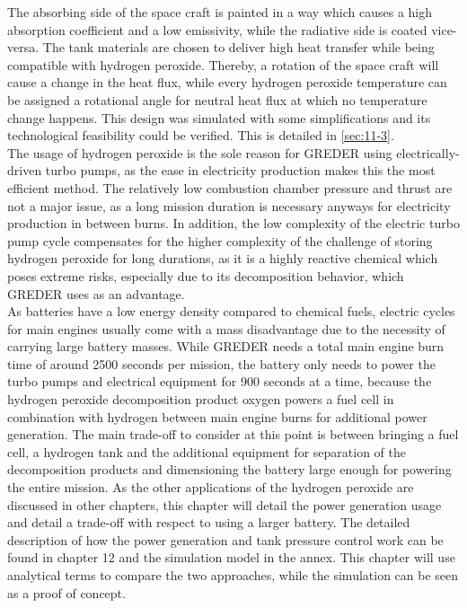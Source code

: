 The absorbing side of the space craft is painted in a way which causes a high absorption coefficient and a low emissivity, while the radiative side is coated vice-versa. The tank materials are chosen to deliver high heat transfer while being compatible with hydrogen peroxide. Thereby, a rotation of the space craft will cause a change in the heat flux, while every hydrogen peroxide temperature can be assigned a rotational angle for neutral heat flux at which no temperature change happens. This design was simulated with some simplifications and its technological feasibility could be verified. This is detailed in \autoref{sec:11-3}. \\

The usage of hydrogen peroxide is the sole reason for GREDER using electrically-driven turbo pumps, as the ease in electricity production makes this the most efficient method. The relatively low combustion chamber pressure and thrust are not a major issue, as a long mission duration is necessary anyways for electricity production in between burns. In addition, the low complexity of the electric turbo pump cycle compensates for the higher complexity of the challenge of storing hydrogen peroxide for long durations, as it is a highly reactive chemical which poses extreme risks, especially due to its decomposition behavior, which GREDER uses as an advantage. \\

As batteries have a low energy density compared to chemical fuels, electric cycles for main engines usually come with a mass disadvantage due to the necessity of carrying large battery masses. While GREDER needs a total main engine burn time of around 2500 seconds per mission, the battery only needs to power the turbo pumps and electrical equipment for 900 seconds at a time, because the hydrogen peroxide decomposition product oxygen powers a fuel cell in combination with hydrogen between main engine burns for additional power generation. The main trade-off to consider at this point is between bringing a fuel cell, a hydrogen tank and the additional equipment for separation of the decomposition products and dimensioning the battery large enough for powering the entire mission. As the other applications of the hydrogen peroxide are discussed in other chapters, this chapter will detail the power generation usage and detail a trade-off with respect to using a larger battery. The detailed description of how the power generation and tank pressure control work can be found in chapter 12 and the simulation model in the annex. This chapter will use analytical terms to compare the two approaches, while the simulation can be seen as a proof of concept.\\

